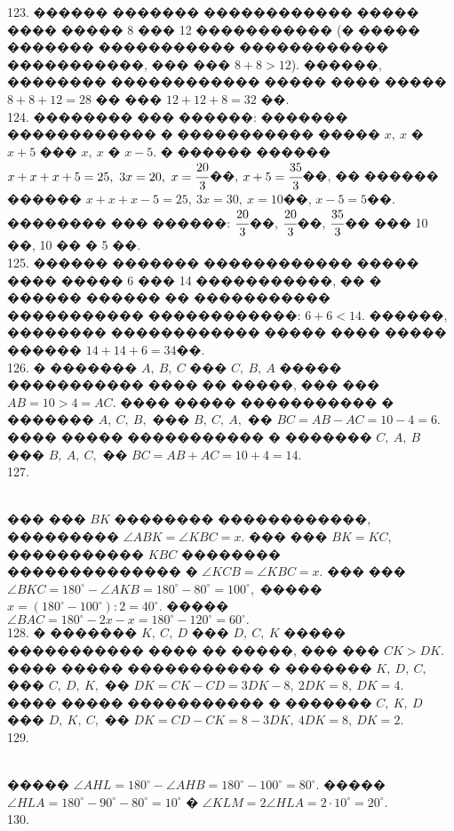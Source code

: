 \documentclass[12pt]{article}
\begin{document}
123. ������ ������� ������������ ����� ���� ����� 8 ��� 12 ����������� (� ����� ������� ����������� ������������ �����������, ��� ��� $8+8>12$). ������, �������� ������������ ����� ���� ����� $8+8+12=28$ �� ��� $12+12+8=32$ ��.\\
124. �������� ��� ������: ������� ������������ � ����������� ����� $x,\ x$ � $x+5$ ��� $x,\ x$ � $x-5.$ � ������ ������ $x+x+x+5=25,\ 3x=20,\ x=\cfrac{20}{3}$��, $x+5=\cfrac{35}{3}$��, �� ������ ������ $x+x+x-5=25,\ 3x=30,\ x=10$��, $x-5=5$��. �������� ��� ������: $\cfrac{20}{3}$��, $\cfrac{20}{3}$��, $\cfrac{35}{3}$�� ��� 10 ��, 10 �� � 5 ��.\\
125. ������ ������� ������������ ����� ���� ����� 6 ��� 14 �����������, �� � ������ ������ �� ����������� ����������� ������������: $6+6<14.$ ������, �������� ������������ ����� ���� ����� ������ $14+14+6=34$��.\\
126. � ������� $A,\ B,\ C$ ��� $C,\ B,\ A$ ����� ����������� ���� �� �����, ��� ��� $AB=10>4=AC.$ ���� ����� ����������� � ������� $A,\ C,\ B,$ ��� $B,\ C,\ A,$ �� $BC=AB-AC=10-4=6.$ ���� ����� ����������� � ������� $C,\ A,\ B$ ��� $B,\ A,\ C,$ �� $BC=AB+AC=10+4=14.$\\
127. \begin{figure}[ht!]
\end{figure}\\
��� ��� $BK$ �������� ������������, ��������� $\angle ABK=\angle KBC=x.$ ��� ��� $BK=KC,$ ����������� $KBC$ �������� �������������� � $\angle KCB=\angle KBC=x.$ ��� ��� $\angle BKC=180^\circ-\angle AKB=180^\circ-80^\circ=100^\circ,$ ����� $x=(180^\circ-100^\circ):2=40^\circ.$ ����� $\angle BAC=180^\circ-2x-x=180^\circ-120^\circ=60^\circ.$\\
128. � ������� $K,\ C,\ D$ ��� $D,\ C,\ K$ ����� ����������� ���� �� �����, ��� ��� $CK>DK.$ ���� ����� ����������� � ������� $K,\ D,\ C,$ ��� $C,\ D,\ K,$ �� $DK=CK-CD=3DK-8,\ 2DK=8,\ DK=4.$ ���� ����� ����������� � ������� $C,\ K,\ D$ ��� $D,\ K,\ C,$ �� $DK=CD-CK=8-3DK,\ 4DK=8,\ DK=2.$\\
129. \begin{figure}[ht!]
\end{figure}\\
����� $\angle AHL=180^\circ-\angle AHB=180^\circ-100^\circ=80^\circ.$ ����� $\angle HLA=180^\circ-90^\circ-80^\circ=10^\circ$ � $\angle KLM=2\angle HLA=2\cdot10^\circ=20^\circ.$\\
130. \begin{figure}[ht!]
\end{figure}\\
\end{document}
